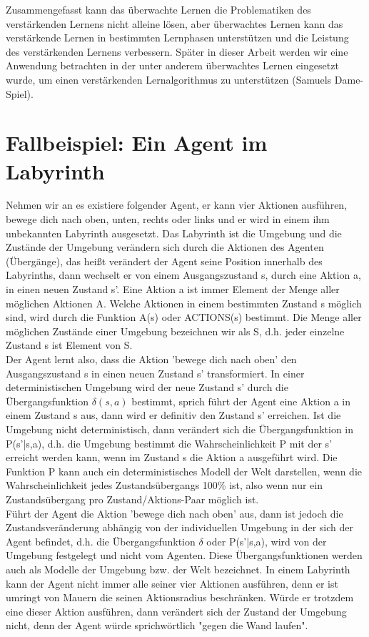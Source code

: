 Zusammengefasst kann das überwachte Lernen die Problematiken des verstärkenden Lernens nicht alleine lösen, aber überwachtes Lernen kann das verstärkende Lernen in bestimmten Lernphasen unterstützen und die Leistung des verstärkenden Lernens verbessern. Später in dieser Arbeit werden wir eine Anwendung betrachten in der unter anderem überwachtes Lernen eingesetzt wurde, um einen verstärkenden Lernalgorithmus zu unterstützen (Samuels Dame-Spiel).

\section{Fallbeispiel: Ein Agent im Labyrinth}
Nehmen wir an es existiere folgender Agent, er kann vier Aktionen ausführen, bewege dich nach oben, unten, rechts oder links und er wird in einem ihm unbekannten Labyrinth ausgesetzt. Das Labyrinth ist die Umgebung und die Zustände der Umgebung verändern sich durch die Aktionen des Agenten (Übergänge), das heißt verändert der Agent seine Position innerhalb des Labyrinths, dann wechselt er von einem Ausgangszustand s, durch eine Aktion a, in einen neuen Zustand s'. Eine Aktion a ist immer Element der Menge aller möglichen Aktionen A. Welche Aktionen in einem bestimmten Zustand s möglich sind, wird durch die Funktion A(s) oder ACTIONS(s) bestimmt. Die Menge aller möglichen Zustände einer Umgebung bezeichnen wir als S, d.h. jeder einzelne Zustand s ist Element von S.\\

Der Agent lernt also, dass die Aktion 'bewege dich nach oben' den Ausgangszustand s in einen neuen Zustand s' transformiert. In einer deterministischen Umgebung wird der neue Zustand s' durch die Übergangsfunktion $\delta(s, a)$ bestimmt, sprich führt der Agent eine Aktion a in einem Zustand s aus, dann wird er definitiv den Zustand s' erreichen. Ist die Umgebung nicht deterministisch, dann verändert sich die Übergangsfunktion in P(s'|s,a), d.h. die Umgebung bestimmt die Wahrscheinlichkeit P mit der s' erreicht werden kann, wenn im Zustand s die Aktion a ausgeführt wird. Die Funktion P kann auch ein deterministisches Modell der Welt darstellen, wenn die Wahrscheinlichkeit jedes Zustandsübergangs 100\% ist, also wenn nur ein Zustandsübergang pro Zustand/Aktions-Paar möglich ist. \\

Führt der Agent die Aktion 'bewege dich nach oben' aus, dann ist jedoch die Zustandsveränderung abhängig von der individuellen Umgebung in der sich der Agent befindet, d.h. die Übergangsfunktion $\delta$ oder P(s'|s,a), wird von der Umgebung festgelegt und nicht vom Agenten. Diese Übergangsfunktionen werden auch als Modelle der Umgebung bzw. der Welt bezeichnet. In einem Labyrinth kann der Agent nicht immer alle seiner vier Aktionen ausführen, denn er ist umringt von Mauern die seinen Aktionsradius beschränken. Würde er trotzdem eine dieser Aktion ausführen, dann verändert sich der Zustand der Umgebung nicht, denn der Agent würde sprichwörtlich "gegen die Wand laufen". \\

